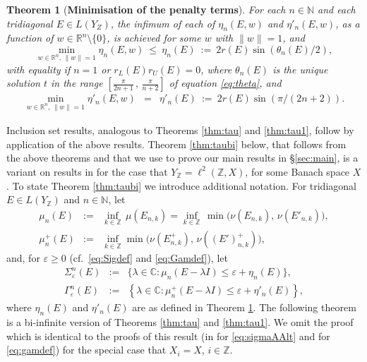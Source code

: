 \documentclass[preprint,1p,11pt]{elsarticle}
\newcommand\C{{\mathbb C}}
\newcommand\N{{\mathbb N}}
\newcommand\R{{\mathbb R}}
\newcommand\Z{{\mathbb Z}}
\newcommand\eps{{\varepsilon}}
\newtheorem{theorem}{Theorem}[section]
\numberwithin{equation}{section}   %
\numberwithin{figure}{section}  %
\begin{document}
\begin{theorem}[{\bf Minimisation of the penalty terms}] \label{thm:inf} For each $n\in \N$ and each tridiagonal $E\in L(Y_Z)$, the infimum of each of $\eta_n(E,w)$ and $\eta'_n(E,w)$, as a function of $w\in\R^n\setminus\{0\}$, is achieved for some $w$ with $\|w\|=1$, and
\begin{equation} \label{eq:wtauinf}
\min_{w\in \R^n, \, \|w\|=1} \eta_n(E,w)\ \leq\ \eta_n(E)\ :=\ 2r(E) \sin(\theta_n(E)/2),
\end{equation}
with equality if $n=1$ or $r_L(E)r_U(E)=0$,
where $\theta_n(E)$ is the unique solution $t$ in the range
$\left[\frac{\pi}{2n+1}\,,\,\frac{\pi}{n+2}\right]$
of equation \eqref{eq:theta}, and
\begin{eqnarray}  \label{eq:wtau1inf}
\min_{w\in \R^n, \, \|w\|=1} \eta'_n(E,w) &=& \eta'_n(E)\ :=\ 2r(E) \sin(\pi/(2n+2)).
\end{eqnarray}
\end{theorem}


Inclusion set results, analogous to Theorems \ref{thm:tau} and \ref{thm:tau1}, follow by application of the above results.  Theorem \ref{thm:taubi} below, that follows from the above theorems and that we use to prove our main results in \S\ref{sec:main}, is a variant on results in \cite{CW.Heng.ML:SpecIncl1} for the case that $Y_\Z=\ell^2(\Z,X)$, for some Banach space $X$. To state Theorem \ref{thm:taubi} we introduce additional notation. For tridiagonal $E\in L(Y_\Z)$ and $n\in \N$, let
\begin{eqnarray} \label{eq:mudag}
\mu_n(E) & :=& \inf_{k\in \Z} \, \mu(E_{n,k})  = \inf_{k\in \Z} \, \min\Big(\nu\left(E_{n,k}\right),\,\nu\left(E'_{n,k}\right)\Big),\\ \label{eq:mudag2}
\mu^+_n(E)&  := & \inf_{k\in \Z} \min\Big(\nu\left(E^+_{n,k}\right),\,\nu\left((E')^+_{n,k}\right)\Big),
\end{eqnarray}
and, for $\eps\geq 0$ (cf.~\eqref{eq:Sigdef} and \eqref{eq:Gamdef}), let
\begin{eqnarray} \label{eq:sigmaAAlt}
\Sigma^n_{\eps}(E) & := &  \{\lambda\in \C:\mu_n(E-\lambda I)\leq \eps+\eta_n(E)\},\\ \label{eq:gamdef}
\Gamma^n_{\eps}(E) &:=  &\left\{\lambda\in \C : \mu^+_n(E-\lambda I)\leq \eps+\eta'_n(E)\right\},
\end{eqnarray} 
 where $\eta_n(E)$ and $\eta'_n(E)$ are as defined in Theorem \ref{thm:inf}. The following theorem is a bi-infinite version of Theorems \ref{thm:tau} and \ref{thm:tau1}. We omit the proof which is identical to the  proofs of this result (in \cite[Thm.~3.5, Cor.~3.8]{CW.Heng.ML:SpecIncl1} for \eqref{eq:sigmaAAlt} and  \cite[Thm.~5.3, Cor.~5.4]{CW.Heng.ML:SpecIncl1} for \eqref{eq:gamdef}) for the special case that $X_i=X$, $i\in \Z$.
\end{document}
